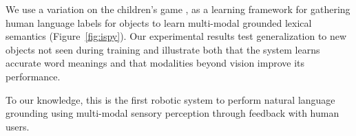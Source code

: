 We use a variation on the children's game \ispy, as a learning framework for gathering human language labels for objects to learn multi-modal grounded lexical semantics (Figure~\ref{fig:ispy}).
Our experimental results test generalization to new objects not seen during training and illustrate both that the system learns accurate word meanings and that modalities beyond vision improve its performance.

To our knowledge, this is the first robotic system to perform natural language grounding using multi-modal sensory perception through feedback with human users.